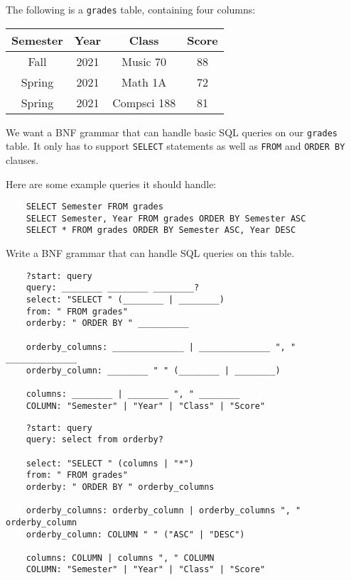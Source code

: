 \begin{blocksection}
  \question
  The following is a \lstinline{grades} table, containing four columns:

  \begin{center}
    \begin{tabular}{|c|c|c|c|}
      \hline
      \textbf{Semester} & \textbf{Year} & \textbf{Class} & \textbf{Score} \\
      \hline
      Fall & 2021 & Music 70 & 88 \\
      \hline
      Spring & 2021 & Math 1A & 72 \\
      \hline
      Spring & 2021 & Compsci 188 & 81 \\
      \hline
    \end{tabular}
  \end{center}

  We want a BNF grammar that can handle basic SQL queries on our \lstinline{grades} table. It only has to support \lstinline{SELECT} statements as well as \lstinline{FROM} and \lstinline{ORDER BY} clauses. 
  
  Here are some example queries it should handle:
  \begin{lstlisting}
    SELECT Semester FROM grades
    SELECT Semester, Year FROM grades ORDER BY Semester ASC
    SELECT * FROM grades ORDER BY Semester ASC, Year DESC
  \end{lstlisting}

  Write a BNF grammar that can handle SQL queries on this table.

  \ifprintanswers\else
  \begin{lstlisting}
    ?start: query
    query: ________ ________ ________?
    select: "SELECT " (________ | ________)
    from: " FROM grades"
    orderby: " ORDER BY " __________

    orderby_columns: ______________ | ______________ ", " ______________
    orderby_column: ________ " " (________ | ________)

    columns: ________ | ________ ", " ________
    COLUMN: "Semester" | "Year" | "Class" | "Score"
  \end{lstlisting}
  \fi
  
  \begin{solution}[1.5in]
  \begin{lstlisting}
    ?start: query
    query: select from orderby?
    
    select: "SELECT " (columns | "*")
    from: " FROM grades"
    orderby: " ORDER BY " orderby_columns

    orderby_columns: orderby_column | orderby_columns ", " orderby_column
    orderby_column: COLUMN " " ("ASC" | "DESC")

    columns: COLUMN | columns ", " COLUMN
    COLUMN: "Semester" | "Year" | "Class" | "Score"
  \end{lstlisting}
  \end{solution}
\end{blocksection}


